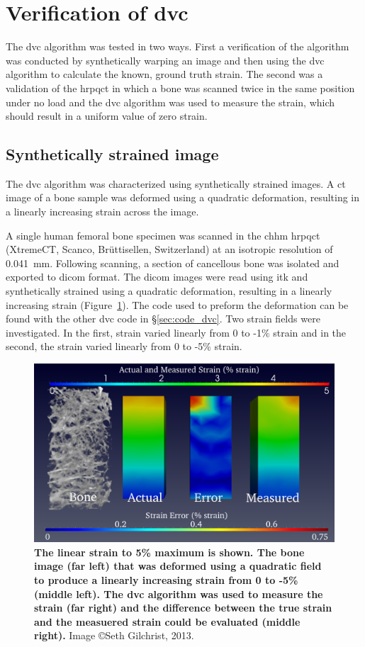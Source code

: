 \clearpage

\section{Verification of \acs*{dvc}}
\label{sec:dvc_results_validation}
The \ac{dvc} algorithm was tested in two ways.
First a verification of the algorithm was conducted by synthetically warping an image and then using the \ac{dvc} algorithm to calculate the known, ground truth strain.
The second was a validation of the \ac{hrpqct} in which a bone was scanned twice in the same position under no load and the \ac{dvc} algorithm was used to measure the strain, which should result in a uniform value of zero strain.

\subsection{Synthetically strained image}
\label{sec:dvc_results_synthetic}
The \ac{dvc} algorithm was characterized using synthetically strained images.
A \ac{ct} image of a bone sample was deformed using a quadratic deformation, resulting in a linearly increasing strain across the image.

A single human femoral bone specimen was scanned in the \ac{chhm} \ac{hrpqct} (XtremeCT, Scanco, Br\"{u}ttisellen, Switzerland) at an isotropic resolution of 0.041~\ac{mm}.
Following scanning, a section of cancellous bone was isolated and exported to \ac{dicom} format.
The \ac{dicom} images were read using \ac{itk} and synthetically strained using a quadratic deformation, resulting in a linearly increasing strain (Figure~\ref{fig:CompareStrain5Percent}).
The code used to preform the deformation can be found with the other \ac{dvc} code in \S\ref{sec:code_dvc}.
Two strain fields were investigated.
In the first, strain varied linearly from 0 to -1\% strain and in the second, the strain varied linearly from 0 to -5\% strain.

\begin{figure}
\centering
\includegraphics[width=.8\linewidth]{./appendixDvc/figures/CompareStrain5Percent}
\caption[5\% synthetic strain comparison]{\textbf{The linear strain to 5\% maximum is shown. The bone image (far left) that was deformed using a quadratic field to produce a linearly increasing strain from 0 to -5\% (middle left). The \ac{dvc} algorithm was used to measure the strain (far right) and the difference between the true strain and the measuered strain could be evaluated (middle right).} Image \copyright Seth Gilchrist, 2013.}
\label{fig:CompareStrain5Percent}
\end{figure}

